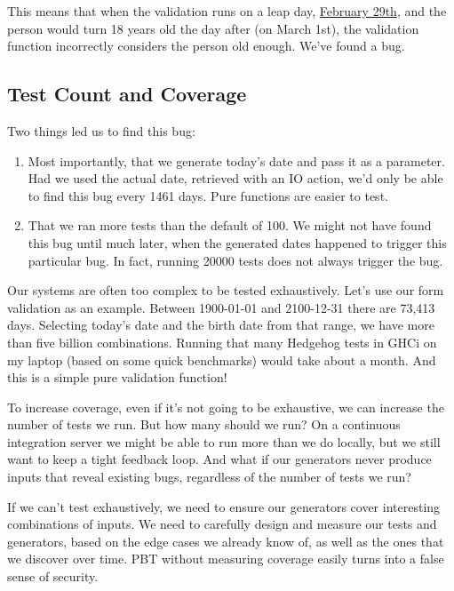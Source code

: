 This means that when the validation runs on a leap day,
\href{https://en.wikipedia.org/wiki/February_29\#Born_on_February_29}{February
29th}, and the person would turn 18 years old the day after (on March
1st), the validation function incorrectly considers the person old
enough. We've found a bug.

\subsection{Test Count and Coverage}
\label{test-count-and-coverage}

Two things led us to find this bug:

\begin{enumerate}
\item
  Most importantly, that we generate today's date and pass it as a
  parameter. Had we used the actual date, retrieved with an IO action,
  we'd only be able to find this bug every 1461 days. Pure functions are
  easier to test.
\item
  That we ran more tests than the default of 100. We might not have
  found this bug until much later, when the generated dates happened to
  trigger this particular bug. In fact, running 20000 tests does not
  always trigger the bug.
\end{enumerate}
Our systems are often too complex to be tested exhaustively. Let's use
our form validation as an example. Between 1900-01-01 and 2100-12-31
there are 73,413 days. Selecting today's date and the birth date from
that range, we have more than five billion combinations. Running that
many Hedgehog tests in GHCi on my laptop (based on some quick
benchmarks) would take about a month. And this is a simple pure
validation function!

To increase coverage, even if it's not going to be exhaustive, we can
increase the number of tests we run. But how many should we run? On a
continuous integration server we might be able to run more than we do
locally, but we still want to keep a tight feedback loop. And what if
our generators never produce inputs that reveal existing bugs,
regardless of the number of tests we run?

If we can't test exhaustively, we need to ensure our generators cover
interesting combinations of inputs. We need to carefully design and
measure our tests and generators, based on the edge cases we already
know of, as well as the ones that we discover over time. PBT without
measuring coverage easily turns into a false sense of security.

